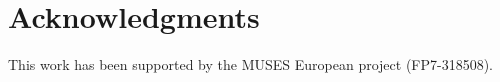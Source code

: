 \documentclass{sig-alternate}
\begin{document}
\section{Acknowledgments}
This work has been supported by the MUSES European project (FP7-318508).

%

%
%
\end{document}
